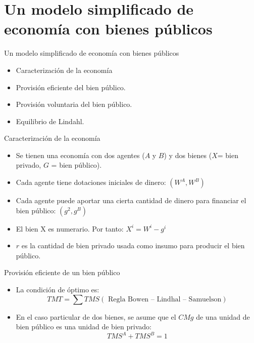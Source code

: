 \section[Modelo]{Un modelo simplificado de economía con bienes públicos}

\begin{frame}{Un modelo simplificado de economía con bienes públicos}
	\begin{itemize}
		\item Caracterización de la economía
		\item Provisión eficiente del bien público.
		\item Provisión voluntaria del bien público.
		\item Equilibrio de Lindahl.
	\end{itemize}
\end{frame}
\begin{frame}{Caracterización de la economía}
	\begin{itemize}
		\item Se tienen una economía con dos agentes ($A$ y $B$) y dos bienes ($X$= bien privado, $G$ = bien público).
		\item Cada agente tiene dotaciones iniciales de dinero: $(W^A, W^B)$
		\item Cada agente puede aportar una cierta cantidad de dinero para financiar el bien público: $(g^2, g^B)$
		\item El bien X es numerario. Por tanto: $X^i = W^i - g^i$
		\item $r$ es la cantidad de bien privado usada como insumo para producir el bien público.
	\end{itemize}
\end{frame}
\begin{frame}{Provisión eficiente de un bien público}
	\begin{itemize}
		\item La condición de óptimo es: 
				$$TMT = \sum TMS (\text{ Regla Bowen – Lindhal – Samuelson})$$
		\item En el caso particular de dos bienes, se asume que el $CMg$ de una unidad de bien público es una unidad de bien privado:
				$$TMS^A + TMS^B = 1$$
	\end{itemize}
\end{frame}
